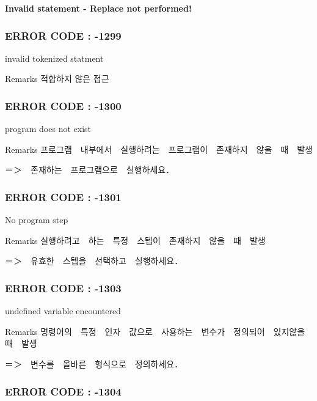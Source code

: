{\bfseries Invalid statement -\/ Replace not performed!}



 \subsubsection*{E\-R\-R\-O\-R C\-O\-D\-E \-: -\/1299 }

invalid tokenized statment \begin{DoxyRemark}{Remarks}
적합하지 않은 접근
\end{DoxyRemark}


 \subsubsection*{E\-R\-R\-O\-R C\-O\-D\-E \-: -\/1300 }

program does not exist \begin{DoxyRemark}{Remarks}
프로그램　내부에서　실행하려는　프로그램이　존재하지　않을　때　발생 \par
 ＝＞　존재하는　프로그램으로　실행하세요．
\end{DoxyRemark}


 \subsubsection*{E\-R\-R\-O\-R C\-O\-D\-E \-: -\/1301}

No program step \begin{DoxyRemark}{Remarks}
실행하려고　하는　특정　스텝이　존재하지　않을　때　발생 \par
 ＝＞　유효한　스텝을　선택하고　실행하세요．
\end{DoxyRemark}


 \subsubsection*{E\-R\-R\-O\-R C\-O\-D\-E \-: -\/1303 }

undefined variable encountered \begin{DoxyRemark}{Remarks}
명령어의　특정　인자　값으로　사용하는　변수가　정의되어　있지않을　때　발생 \par
 ＝＞　변수를　올바른　형식으로　정의하세요．
\end{DoxyRemark}


 \subsubsection*{E\-R\-R\-O\-R C\-O\-D\-E \-: -\/1304 }

